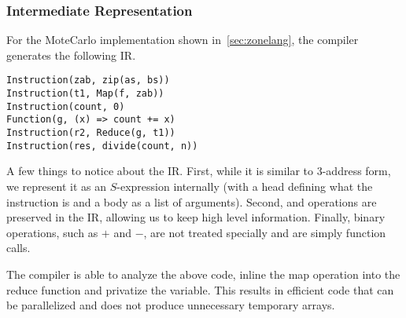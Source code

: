 \subsubsection{Intermediate Representation}

For the MoteCarlo implementation shown in~\ref{sec:zonelang}, the 
	compiler generates the following IR.

\begin{verbatim}
Instruction(zab, zip(as, bs))
Instruction(t1, Map(f, zab))
Instruction(count, 0)
Function(g, (x) => count += x)
Instruction(r2, Reduce(g, t1))
Instruction(res, divide(count, n))
\end{verbatim}

A few things to notice about the IR.
First, while it is similar to $3$-address form,
	we represent it as an $S$-expression internally 
	(with a head defining what the instruction is and a body
	as a list of arguments).
Second,  and  operations are preserved in the IR, 
	allowing us to keep high level information.
Finally, binary operations, such as $+$ and $-$, are not
	treated specially and are simply function calls.

The compiler is able to analyze the above code, inline the map operation
into the reduce function and privatize the  variable. This
results in efficient code that can be parallelized and does not produce
unnecessary temporary arrays.

